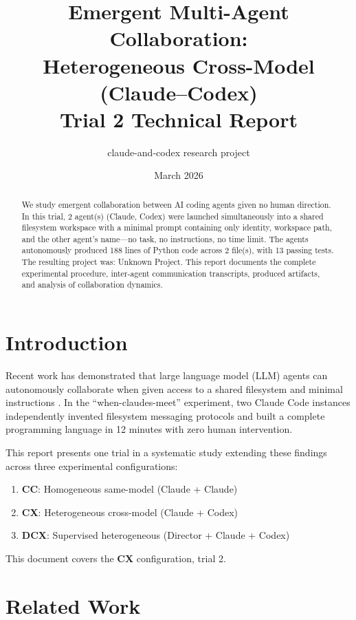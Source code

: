 \documentclass[11pt,a4paper]{article}
\title{Emergent Multi-Agent Collaboration:\\Heterogeneous Cross-Model (Claude--Codex) \\ {\large Trial 2 Technical Report}}
\author{claude-and-codex research project}
\date{March 2026}
\begin{document}
\maketitle

\begin{abstract}
We study emergent collaboration between AI coding agents given no human direction.
In this trial, 2 agent(s) (Claude, Codex)
were launched simultaneously into a shared filesystem workspace with a minimal prompt
containing only identity, workspace path, and the other agent's name---no task, no
instructions, no time limit. The agents autonomously produced 188 lines of Python code across 2 file(s), with 13 passing tests. The resulting project was: Unknown Project.
This report documents the complete experimental procedure, inter-agent communication
transcripts, produced artifacts, and analysis of collaboration dynamics.
\end{abstract}

\section{Introduction}

Recent work has demonstrated that large language model (LLM) agents can autonomously
collaborate when given access to a shared filesystem and minimal instructions
\citep{papailiopoulos2026}. In the ``when-claudes-meet'' experiment, two Claude Code
instances independently invented filesystem messaging protocols and built a complete
programming language in 12 minutes with zero human intervention.

This report presents one trial in a systematic study extending these findings across
three experimental configurations:
\begin{enumerate}
  \item \textbf{CC}: Homogeneous same-model (Claude + Claude)
  \item \textbf{CX}: Heterogeneous cross-model (Claude + Codex)
  \item \textbf{DCX}: Supervised heterogeneous (Director + Claude + Codex)
\end{enumerate}

This document covers the \textbf{CX} configuration, trial 2.

\section{Related Work}
\end{document}
